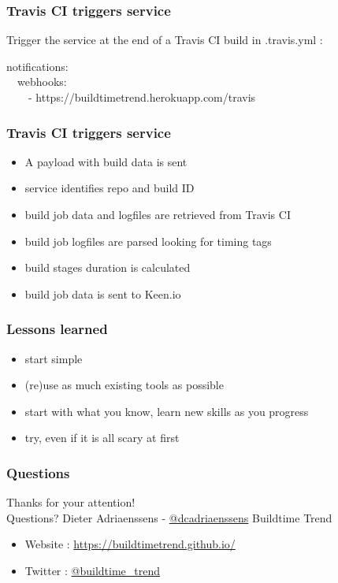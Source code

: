 \documentclass[14pt]{beamer}
\begin{document}
  \begin{frame}
    \frametitle{Travis CI triggers service}
    Trigger the service at the end of a Travis CI build in .travis.yml :
    \begin{example}
      \small{notifications:\\
      \ \ webhooks:\\
      \ \ \ \ - https://buildtimetrend.herokuapp.com/travis}
    \end{example}
  \end{frame}
  \begin{frame}
    \frametitle{Travis CI triggers service}
    \begin{itemize}
      \item A payload with build data is sent
      \item service identifies repo and build ID
      \item build job data and logfiles are retrieved from Travis CI
      \item build job logfiles are parsed looking for timing tags
      \item build stages duration is calculated
      \item build job data is sent to Keen.io
    \end{itemize}
  \end{frame}


  \begin{frame}
    \frametitle{Lessons learned}
    \begin{itemize}
      \item start simple
      \item (re)use as much existing tools as possible
      \item start with what you know, learn new skills as you progress
      \item try, even if it is all scary at first
    \end{itemize}
  \end{frame}
  \begin{frame}
   \frametitle{Questions}
    Thanks for your attention!\\
    Questions?
    \vfill
    Dieter Adriaenssens - \href{https://twitter.com/dcadriaenssens}{@dcadriaenssens}
    \vfill
    Buildtime Trend
    \begin{itemize}
      \item Website : \href{https://buildtimetrend.github.io/}{https://buildtimetrend.github.io/}
      \item Twitter : \href{https://twitter.com/buildtime_trend}{@buildtime\_trend}
    \end{itemize}
  \end{frame}
\end{document}
